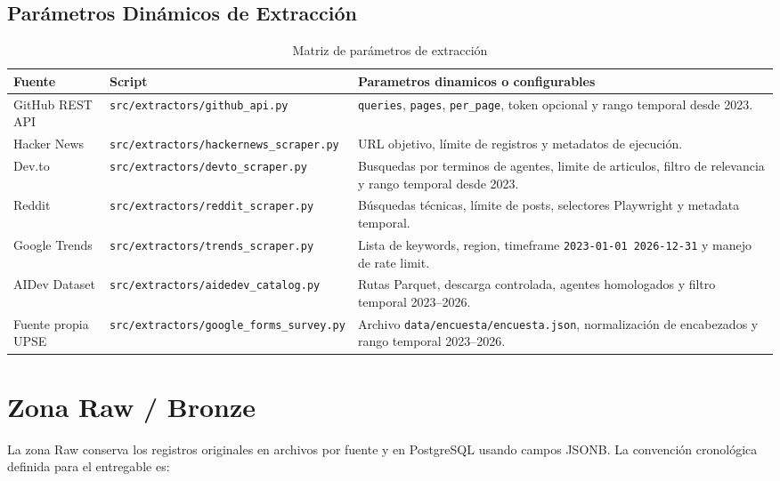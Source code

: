 \documentclass[12pt,a4paper]{article}
\newcommand{\pathcode}[1]{\begingroup\footnotesize\ttfamily\nolinkurl{#1}\endgroup}
\begin{document}
\subsection{Par\'ametros Din\'amicos de Extracci\'on}

\begin{table}[H]
\centering
\scriptsize
{}
\begin{tabular}{|P{2.7cm}|P{4.5cm}|P{6.2cm}|}
\hline
{}
\textbf{Fuente} & \textbf{Script} & \textbf{Parametros dinamicos o configurables} \\ \hline
GitHub REST API & \pathcode{src/extractors/github_api.py} & \pathcode{queries}, \pathcode{pages}, \pathcode{per_page}, token opcional y rango temporal desde 2023. \\ \hline
Hacker News & \pathcode{src/extractors/hackernews_scraper.py} & URL objetivo, l\'imite de registros y metadatos de ejecuci\'on. \\ \hline
Dev.to & \pathcode{src/extractors/devto_scraper.py} & Busquedas por terminos de agentes, limite de articulos, filtro de relevancia y rango temporal desde 2023. \\ \hline
Reddit & \pathcode{src/extractors/reddit_scraper.py} & B\'usquedas t\'ecnicas, l\'imite de posts, selectores Playwright y metadata temporal. \\ \hline
Google Trends & \pathcode{src/extractors/trends_scraper.py} & Lista de keywords, region, timeframe \pathcode{2023-01-01 2026-12-31} y manejo de rate limit. \\ \hline
AIDev Dataset & \pathcode{src/extractors/aidedev_catalog.py} & Rutas Parquet, descarga controlada, agentes homologados y filtro temporal 2023--2026. \\ \hline
Fuente propia UPSE & \pathcode{src/extractors/google_forms_survey.py} & Archivo \pathcode{data/encuesta/encuesta.json}, normalizaci\'on de encabezados y rango temporal 2023--2026. \\ \hline
\end{tabular}
\caption{Matriz de par\'ametros de extracci\'on}
\end{table}

\section{Zona Raw / Bronze}

La zona Raw conserva los registros originales en archivos por fuente y en PostgreSQL usando campos JSONB. La convenci\'on cronol\'ogica definida para el entregable es:
\end{document}
